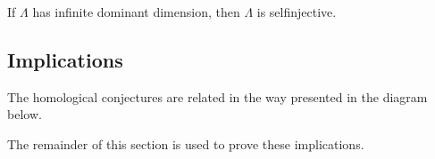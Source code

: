 \begin{conj} 
	If $\Lambda$ has infinite dominant dimension, then $\Lambda$ is selfinjective.
\end{conj}

\subsection{Implications}
The homological conjectures are related in the way presented in the diagram below.


The remainder of this section is used to prove these implications.

